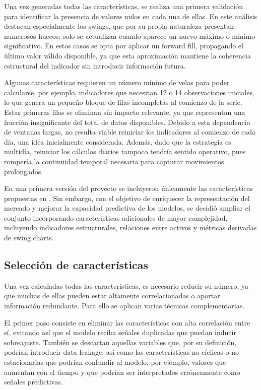 Una vez generadas todas las características, se realiza una primera validación para identificar la presencia de valores nulos en cada una de ellas. En
este análisis destacan especialmente los swings, que por su propia naturaleza presentan numerosos huecos: solo se actualizan cuando aparece un nuevo
máximo o mínimo significativo. En estos casos se opta por aplicar un forward fill, propagando el último valor válido disponible, ya que esta
aproximación mantiene la coherencia estructural del indicador sin introducir información futura.

Algunas características requieren un número mínimo de velas para poder calcularse, por ejemplo, indicadores que necesitan 12 o 14 observaciones
iniciales, lo que genera un pequeño bloque de filas incompletas al comienzo de la serie. Estas primeras filas se eliminan sin impacto relevante, ya
que representan una fracción insignificante del total de datos disponibles. Debido a esta dependencia de ventanas largas, no resulta viable reiniciar
los indicadores al comienzo de cada día, una idea inicialmente considerada. Además, dado que la estrategia es multidía, reiniciar los cálculos diarios
tampoco tendría sentido operativo, pues rompería la continuidad temporal necesaria para capturar movimientos prolongados.

En una primera versión del proyecto se incluyeron únicamente las características propuestas en \cite{Trullas2024}. Sin embargo, con el objetivo de
enriquecer la representación del mercado y mejorar la capacidad predictiva de los modelos, se decidió ampliar el conjunto incorporando características
adicionales de mayor complejidad, incluyendo indicadores estructurales, relaciones entre activos y métricas derivadas de swing charts.

\subsection{Selección de características}

Una vez calculadas todas las características, es necesario reducir su número, ya que muchas de ellas pueden estar altamente correlacionadas o aportar
información redundante. Para ello se aplican varias técnicas complementarias.

El primer paso consiste en eliminar las características con alta correlación entre sí, evitando así que el modelo reciba señales duplicadas que puedan
inducir sobreajuste. También se descartan aquellas variables que, por su definición, podrían introducir data leakage, así como las características no
cíclicas o no estacionarias que podrían confundir al modelo, por ejemplo, valores que aumentan con el tiempo y que podrían ser interpretados
erróneamente como señales predictivas.

